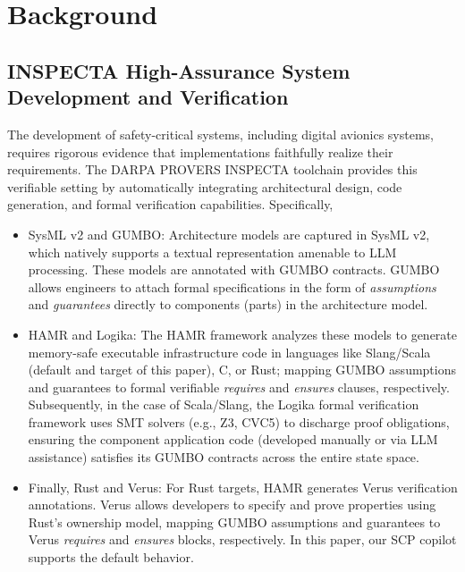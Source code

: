 \documentclass[conference]{IEEEtran}
\begin{document}
\section{Background}
\label{sec:background}

\subsection{INSPECTA High-Assurance System Development and Verification}
\label{sec:gumbo}

The development of safety-critical systems, including digital avionics systems, requires rigorous evidence that implementations faithfully realize their requirements. The DARPA PROVERS INSPECTA toolchain provides this verifiable setting by automatically integrating architectural design, code generation, and formal verification capabilities. Specifically, 
\begin{itemize}
\item SysML v2 and GUMBO: Architecture models are captured in SysML v2, which natively supports a textual representation amenable to LLM processing. These models are annotated with GUMBO contracts. GUMBO allows engineers to attach formal specifications in the form of \textit{assumptions} and \textit{guarantees} directly to components (parts) in the architecture model.

\item HAMR and Logika: The HAMR framework analyzes these models to generate memory-safe executable infrastructure code in languages like Slang/Scala (default and target of this paper), C, or Rust; mapping GUMBO assumptions and guarantees to formal verifiable \textit{requires} and \textit{ensures} clauses, respectively. Subsequently, in the case of Scala/Slang, the Logika formal verification framework uses SMT solvers (e.g., Z3, CVC5) to discharge proof obligations, ensuring the component application code (developed manually or via LLM assistance) satisfies its GUMBO contracts across the entire state space.

\item Finally, Rust and Verus: For Rust targets, HAMR generates Verus verification annotations. Verus allows developers to specify and prove properties using Rust’s ownership model, mapping GUMBO assumptions and guarantees to Verus \textit{requires} and \textit{ensures} blocks, respectively. In this paper, our SCP copilot supports the default behavior. 
\end{itemize}
\end{document}
